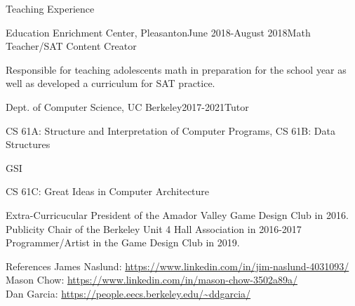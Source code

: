 \documentclass{resume} %
\begin{document}

\begin{rSection}{Teaching Experience} 
\begin{rSubsection}{Education Enrichment Center, Pleasanton}{June 2018-August 2018}{Math Teacher/SAT Content Creator}{}
\item Responsible for teaching adolescents math in preparation for the school year as well as developed a curriculum for SAT practice.
\end{rSubsection}

\begin{rSubsection}{Dept. of Computer Science, UC Berkeley}{2017-2021}{Tutor}{}
\item CS 61A: Structure and Interpretation of Computer Programs, CS 61B: Data Structures
\end{rSubsection}

\begin{rSubsubsection}{GSI}{}
\item CS 61C: Great Ideas in Computer Architecture
\end{rSubsubsection}

\end{rSection}

\begin{rSection}{Extra-Curricucular} \itemsep -3pt
President of the Amador Valley Game Design Club in 2016. \\
Publicity Chair of the Berkeley Unit 4 Hall Association in 2016-2017 \\
Programmer/Artist in the Game Design Club in 2019.
\end{rSection}

%

\begin{rSection}{References}
James Naslund: \url{https://www.linkedin.com/in/jim-naslund-4031093/} \\
Mason Chow: \url{https://www.linkedin.com/in/mason-chow-3502a89a/} \\
Dan Garcia: \url{https://people.eecs.berkeley.edu/~ddgarcia/}
\end{rSection}
\end{document}
